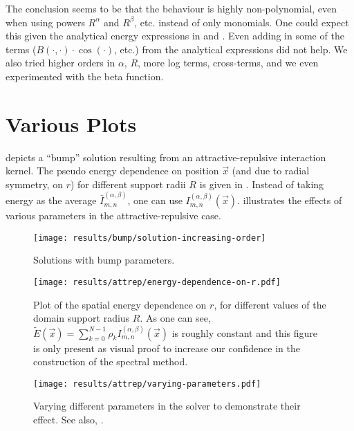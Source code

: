 The conclusion seems to be that the behaviour is highly non-polynomial, even when using powers $R^\alpha$ and $R^\beta$, etc. instead of only monomials.
One could expect this given the analytical energy expressions in  and \cite{2017-explicit-solutions}.
Even adding in some of the terms ($B(\cdot, \cdot) \cdot \cos(\cdot)$, etc.) from the analytical expressions did not help.
We also tried higher orders in $\alpha$, $R$, more log terms, cross-terms, and we even experimented with the beta function.

\chapter{Various Plots}
\label{appendix:various-plots}
 depicts a ``bump'' solution resulting from an attractive-repulsive interaction kernel.
The pseudo energy dependence on position $\vec{x}$ (and due to radial symmetry, on $r$) for different support radii $R$ is given in .
Instead of taking energy as the average $\bar{I}_{m,n}^{(\alpha,\beta)}$, one can use ${I}_{m,n}^{(\alpha,\beta)}(\vec{x})$.
 illustrates the effects of various parameters in the attractive-repulsive case.

\begin{figure}[H]
  \centering
  \texttt{[image: results/bump/solution-increasing-order]}
  \caption[Bump parameter solutions]{Solutions with bump parameters.}
  \label{fig:bump-solutions}
\end{figure}

\begin{figure}[H]
  \centering
  \texttt{[image: results/attrep/energy-dependence-on-r.pdf]}
  \caption[Spatial energy dependence on $r$]{Plot of the spatial energy dependence on $r$, for different values of the domain support radius $R$. As one can see, $\tilde{E}(\vec{x}) = \sum_{k=0}^{N-1} \rho_k {I}_{m,n}^{(\alpha,\beta)}(\vec{x})$ is roughly constant and this figure is only present as visual proof to increase our confidence in the construction of the spectral method.}
  \label{fig:spatial-energy-dependence}
\end{figure}

\pagebreak
\begin{figure}[H]
  \centering
  \texttt{[image: results/attrep/varying-parameters.pdf]}
  \caption[Varying parameters in the solver]{
    Varying different parameters in the solver to demonstrate their effect.
    See also, .
  }
  \label{fig:varying-parameters}
\end{figure}
\pagebreak

